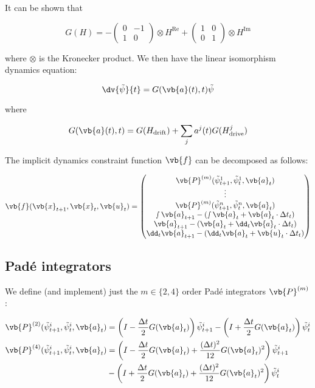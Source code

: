 \documentclass{article}
\newcommand{\isopsi}{\tilde \psi}
\begin{document}
It can be shown that

$$
G(H) =  - \begin{pmatrix} 0 & -1 \\ 1 & 0 \end{pmatrix} \otimes H^{\mathrm{Re}} + \begin{pmatrix} 1 & 0 \\ 0 &1 \end{pmatrix} \otimes H^{\mathrm{Im}}
$$

where $\otimes$ is the Kronecker product.  We then have the linear isomorphism dynamics equation:

$$
\dv{\isopsi}{t} = G(\vb{a}(t),t) \isopsi
$$

where

$$
G(\vb{a}(t),t) = G(H_{\text{drift}}) + \sum_j a^j(t) G(H_{\text{drive}}^j) 
$$

The implicit dynamics constraint function $\vb{f}$ can be decomposed as follows:

$$
\vb{f}(\vb{x}_{t+1}, \vb{x}_t, \vb{u}_t) 
= \begin{pmatrix} 
  \vb{P}^{(m)} (\isopsi^1_{t+1}, \isopsi^1_t, \vb{a}_t) \\ 
  \vdots \\
  \vb{P}^{(m)} (\isopsi^n_{t+1}, \isopsi^n_t, \vb{a}_t) \\
  \smallint \vb{a}_{t+1} - \left(\smallint \vb{a}_t + \vb{a}_t \cdot \Delta t_t  \right) \\
  \vb{a}_{t+1} - \left(\vb{a}_t + \dd_t \vb{a}_t \cdot \Delta t_t  \right) \\
  \dd_t \vb{a}_{t+1} - \left(\dd_t \vb{a}_t + \vb{u}_t \cdot \Delta t_t \right)
  \end{pmatrix}
$$

\newpage
\subsection{Pad\'e integrators}

We define (and implement) just the $m \in \{2, 4\}$ order Pad\'e integrators $\vb{P}^{(m)}$:

\begin{align*}
  \vb{P}^{(2)}(\isopsi^i_{t+1}, \isopsi^i_t, \vb{a}_t) &= \left(I - \frac{\Delta t}{2} G(\vb{a}_t) \right) \isopsi^i_{t+1} -  \left(I + \frac{\Delta t}{2} G(\vb{a}_t) \right) \isopsi^i_{t}\\   
  \vb{P}^{(4)}(\isopsi^i_{t+1}, \isopsi^i_t, \vb{a}_t) &= \left(I - \frac{\Delta t}{2} G(\vb{a}_t) + \frac{(\Delta t)^2}{12} G(\vb{a}_t)^2\right) \isopsi^i_{t+1} \\ 
  &- \left(I + \frac{\Delta t}{2} G(\vb{a}_t) + \frac{(\Delta t)^2}{12} G(\vb{a}_t)^2\right) \isopsi^i_t 
\end{align*}
\end{document}
